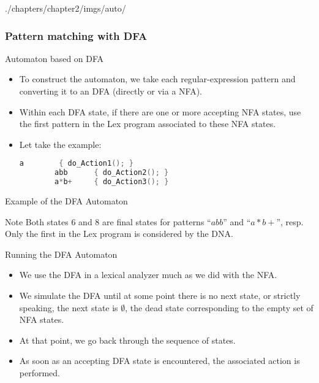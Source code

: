 \begin{graphicspathcontext}{{./chapters/chapter2/imgs/auto/}}
\begin{bibunit}[apalike]
\subsubsection{Pattern matching with DFA}

\tableofcontentslide[sections={1-5},sectionstyle={show/shaded},subsectionstyle={show/shaded/hide},subsubsectionstyle={show/shaded/hide/hide}]

\begin{frame}[fragile]{Automaton based on DFA}
	\begin{itemize}
	\item To construct the automaton, we take each regular-expression pattern and converting it to an DFA (directly or via a NFA).
	\vfill
	\item Within each DFA state, if there are one or more accepting NFA states, use the first pattern in the Lex program associated to these NFA states.
	\vfill
	\item Let take the example:
		\begin{lstlisting}[language=C,basicstyle={\normalsize}]
		a        { do_Action1(); }
		abb      { do_Action2(); }
		a*b+     { do_Action3(); }
		\end{lstlisting}
	\end{itemize}
\end{frame}


\begin{frame}{Example of the DFA Automaton}
	\begin{center}
	\end{center}
	\vfill
	\begin{block}{\small Note}\small
	Both states $6$ and $8$ are final states for patterns ``$abb$'' and ``$a*b+$'', resp.
	Only the first in the Lex program is considered by the DNA.
	\end{block}
\end{frame}

\begin{frame}{Running the DFA Automaton}
	\begin{itemize}
	\item We use the DFA in a lexical analyzer much as we did with the NFA.
	\vfill
	\item We simulate the DFA until at some point there is no next state, or strictly speaking, the next state is $\emptyset$, the dead state corresponding to the empty set of NFA states.
	\vfill
	\item At that point, we go back through the sequence of states.
	\item As soon as an accepting DFA state is encountered, the associated action is performed.
	\end{itemize}
\end{frame}


\end{bibunit}
\end{graphicspathcontext}
